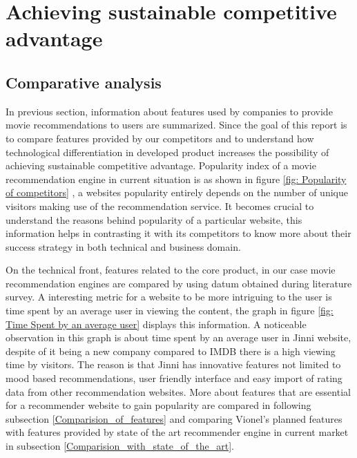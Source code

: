 \chapter{Achieving sustainable competitive advantage} %
\label{Chapter3} %



\section{Comparative analysis}
  In previous section, information about features used by companies to provide movie recommendations to users are summarized. Since the goal of this report is to compare features provided by our competitors and to understand how technological differentiation in developed product increases the possibility of achieving sustainable competitive advantage. Popularity index of a movie recommendation engine in current situation is as shown in figure \ref{fig: Popularity of competitors} , a websites popularity entirely depends on the number of unique visitors making use of the recommendation service. It becomes crucial to understand the reasons behind popularity of a particular website, this information helps in contrasting it with its competitors to know more about their success strategy in both technical and business domain. 

  On the technical front, features related to the core product, in our case movie recommendation engines are compared by using datum obtained during literature survey. A interesting metric for a website to be more intriguing to the user is time spent by an average user in viewing the content, the graph in figure \ref{fig: Time Spent by an average user} displays this information. A noticeable observation in this graph is about time spent by an average user in Jinni website, despite of it being a new company compared to \acrshort{IMDB} there is a high viewing time by visitors. The reason is that Jinni has innovative features not limited to mood based recommendations, user friendly interface and easy import of rating data from other recommendation websites. More about features that are essential for a recommender website to gain popularity are compared in following subsection \ref{Comparision_of_features} and comparing Vionel's planned features with features provided by state of the art recommender engine in current market in subsection \ref{Comparision_with_state_of_the_art}.        

